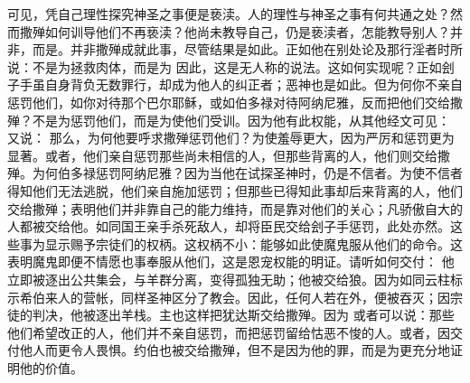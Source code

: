 可见，凭自己理性探究神圣之事便是亵渎。人的理性与神圣之事有何共通之处？然而撒殚如何训导他们不再亵渎？他尚未教导自己，仍是亵渎者，怎能教导别人？并非，而是。并非撒殚成就此事，尽管结果是如此。正如他在别处论及那行淫者时所说：不是为拯救肉体，而是为 因此，这是无人称的说法。这如何实现呢？正如刽子手虽自身背负无数罪行，却成为他人的纠正者；恶神也是如此。但为何你不亲自惩罚他们，如你对待那个巴尔耶稣，或如伯多禄对待阿纳尼雅，反而把他们交给撒殚？不是为惩罚他们，而是为使他们受训。因为他有此权能，从其他经文可见： 又说： 那么，为何他要呼求撒殚惩罚他们？为使羞辱更大，因为严厉和惩罚更为显著。或者，他们亲自惩罚那些尚未相信的人，但那些背离的人，他们则交给撒殚。为何伯多禄惩罚阿纳尼雅？因为当他在试探圣神时，仍是不信者。为使不信者得知他们无法逃脱，他们亲自施加惩罚；但那些已得知此事却后来背离的人，他们交给撒殚；表明他们并非靠自己的能力维持，而是靠对他们的关心；凡骄傲自大的人都被交给他。如同国王亲手杀死敌人，却将臣民交给刽子手惩罚，此处亦然。这些事为显示赐予宗徒们的权柄。这权柄不小：能够如此使魔鬼服从他们的命令。这表明魔鬼即便不情愿也事奉服从他们，这是恩宠权能的明证。请听如何交付： 他立即被逐出公共集会，与羊群分离，变得孤独无助；他被交给狼。因为如同云柱标示希伯来人的营帐，同样圣神区分了教会。因此，任何人若在外，便被吞灭；因宗徒的判决，他被逐出羊栈。主也这样把犹达斯交给撒殚。因为 或者可以说：那些他们希望改正的人，他们并不亲自惩罚，而把惩罚留给怙恶不悛的人。或者，因交付他人而更令人畏惧。约伯也被交给撒殚，但不是因为他的罪，而是为更充分地证明他的价值。\par


